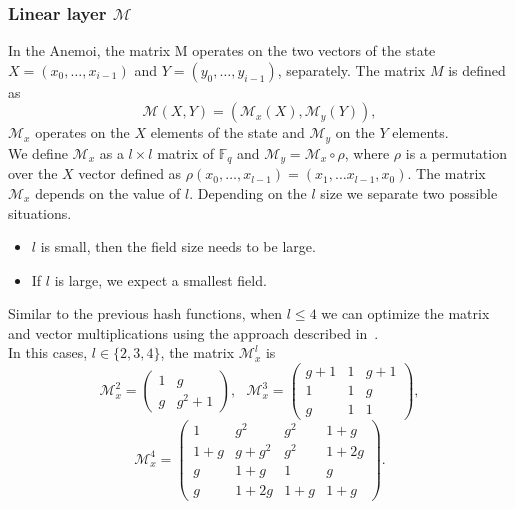 \subsubsection*{Linear layer $\mathcal{M}$}
In the Anemoi, the matrix M operates on the two vectors of the state $X=\left(x_0,\dots,x_{i-1}\right)$ and $Y=\left(y_0,\dots,y_{i-1}\right)$, separately. The matrix $M$ is defined as
\begin{equation}
    \mathcal{M}\left(X,Y\right)=\left(\mathcal{M}_x\left(X\right),\mathcal{M}_y\left(Y\right)\right),
\end{equation}
 $\mathcal{M}_x$ operates on the $X$ elements of the state and $\mathcal{M}_y$ on the $Y$ elements.\\
 We define $\mathcal{M}_x$ as a $l\times l$ matrix of $\mathbb{F}_q$ and $\mathcal{M}_y=\mathcal{M}_x\circ\rho$, where $\rho$ is a permutation over the $X$ vector defined as $\rho\left(x_0,\dots,x_{l-1}\right)=\left(x_1,\dots x_{l-1},x_0\right)$. The matrix $\mathcal{M}_x$ depends on the value of $l$. Depending on the $l$ size we separate two possible situations.
 \begin{itemize}
    \item $l$ is small, then the field size needs to be large.
    \item If $l$ is large, we expect a smallest field.
 \end{itemize}

 Similar to the previous hash functions, when $l \leq 4$ we can optimize the matrix and vector multiplications using the approach described in~\cite{duval2018mds}.\\
 In this cases, $l\in\{2,3,4\}$, the matrix $\mathcal{M}_x^l$ is
 \begin{equation}
    \mathcal{M}_x^2=
        \begin{pmatrix}
            1 & g \\
            g & g^2+1
        \end{pmatrix},\text{ }
    \mathcal{M}_x^3=
        \begin{pmatrix}
            g+1 & 1 & g+1 \\
            1 & 1 & g\\
            g & 1 & 1
        \end{pmatrix}, 
 \end{equation}
 \begin{equation}
    \mathcal{M}_x^4=
        \begin{pmatrix}
            1 & g^2 & g^2 & 1+g\\
            1+g & g+g^2 & g^2 & 1+2g \\
            g & 1+g & 1 & g \\
            g & 1+2g & 1+g & 1+g
        \end{pmatrix}.
 \end{equation}

